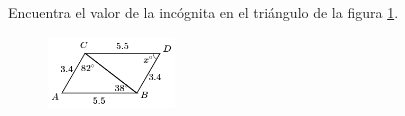 \question[10]  Encuentra el valor de la incógnita en el triángulo de la figura \ref{fig:angle_triangle_23}.
\begin{figure}[H]
    \begin{center}
        \includegraphics[width=0.3\textwidth]{../images/angle_triangle_23.png}
    \end{center}
    \caption{}
    \label{fig:angle_triangle_23}
\end{figure}